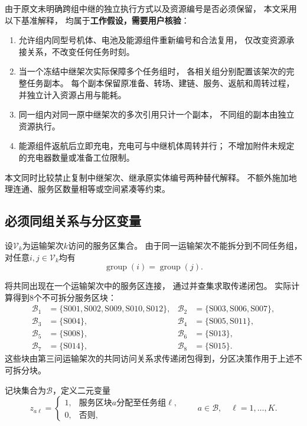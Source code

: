 \documentclass[bwprint]{gmcmthesis}
\begin{document}
由于原文未明确跨组中继的独立执行方式以及资源编号是否必须保留，
本文采用以下基准解释，
均属于\textbf{工作假设，需要用户核验}：

\begin{enumerate}
    \item 允许组内同型号机体、电池及能源组件重新编号和合法复用，
    仅改变资源承接关系，不改变任何任务时刻。

    \item 当一个冻结中继架次实际保障多个任务组时，
    各相关组分别配置该架次的完整任务副本。
    每个副本保留原准备、转场、建链、服务、返航和周转过程，
    并独立计入资源占用与能耗。

    \item 同一组内对同一原中继架次的多次引用只计一个副本，
    不同组的副本由独立资源执行。

    \item 能源组件返航后立即充电，充电可与中继机体周转并行；
    不增加附件未规定的充电器数量或准备工位限制。
\end{enumerate}

本文同时比较禁止复制中继架次、继承原实体编号两种替代解释。
不额外施加地理连通、服务区数量相等或空间紧凑等约束。

\subsection{必须同组关系与分区变量}

设$\mathcal{V}_k$为运输架次$k$访问的服务区集合。
由于同一运输架次不能拆分到不同任务组，
对任意$i,j\in\mathcal{V}_k$均有
\begin{equation}
\operatorname{group}(i)=\operatorname{group}(j).
\end{equation}

将共同出现在一个运输架次中的服务区连接，
通过并查集求取传递闭包。
实际计算得到8个不可拆分服务区块：
\begin{align*}
\mathcal B_1&=\{\mathrm{S001,S002,S009,S010,S012}\},&
\mathcal B_2&=\{\mathrm{S003,S006,S007}\},\\
\mathcal B_3&=\{\mathrm{S004}\},&
\mathcal B_4&=\{\mathrm{S005,S011}\},\\
\mathcal B_5&=\{\mathrm{S008}\},&
\mathcal B_6&=\{\mathrm{S013}\},\\
\mathcal B_7&=\{\mathrm{S014}\},&
\mathcal B_8&=\{\mathrm{S015}\}.
\end{align*}
这些块由第三问运输架次的共同访问关系求传递闭包得到，分区决策作用于上述不可拆分块。

记块集合为$\mathcal{B}$，定义二元变量
\begin{equation}
z_{a\ell}=
\begin{cases}
1, & \text{服务区块$a$分配至任务组$\ell$},\\
0, & \text{否则},
\end{cases}
\qquad
a\in\mathcal{B},\quad \ell=1,\ldots,K.
\end{equation}
\end{document}
